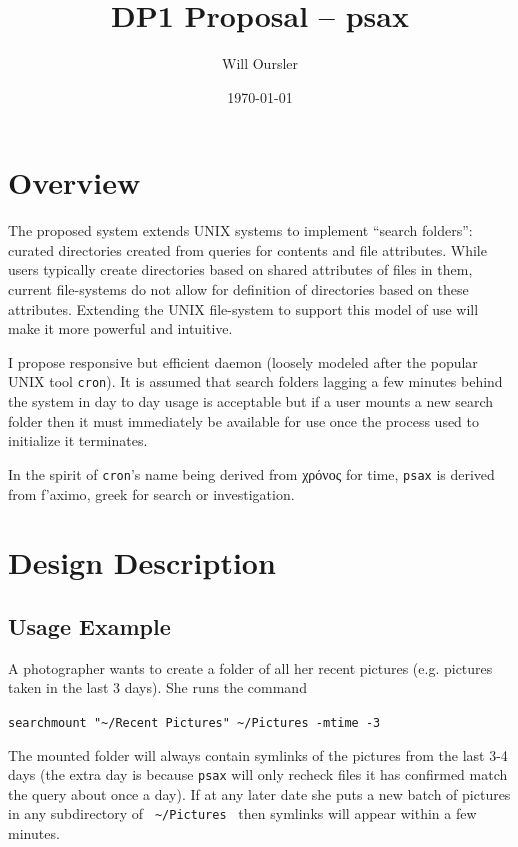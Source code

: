 \documentclass[a4paper]{report}
\title{DP1 Proposal -- psax}
\author{Will Oursler}
\date{\today}
\newcommand{\inlinecode}{\texttt}
\begin{document}
\maketitle

\section{Overview}

The proposed system extends UNIX systems to implement ``search folders'': curated directories created from queries for contents and file attributes. While users typically create directories based on shared attributes of files in them, current file-systems do not allow for definition of directories based on these attributes. Extending the UNIX file-system to support this model of use will make it more powerful and intuitive.

I propose responsive but efficient daemon (loosely modeled after the popular UNIX tool \inlinecode{cron}). It is assumed that search folders lagging a few minutes behind the system in day to day usage is acceptable but if a user mounts a new search folder then it must immediately be available for use once the process used to initialize it terminates.

In the spirit of \inlinecode{cron}'s name being derived from \textgreek{χρόνος} for time, \inlinecode{psax} is derived from \textgreek{f'aximo}, greek for search or investigation. 

\section{Design Description}

\subsection{Usage Example}

A photographer wants to create a folder of all her recent pictures (e.g. pictures taken in the last 3 days). She runs the command

\begin{center}
\inlinecode{searchmount "\textasciitilde/Recent Pictures" \textasciitilde/Pictures -mtime -3}
\end{center}

The mounted folder will always contain symlinks of the pictures from the last 3-4 days (the extra day is because \inlinecode{psax} will only recheck files it has confirmed match the query about once a day). If at any later date she puts a new batch of pictures in any subdirectory of \inlinecode{ \textasciitilde/Pictures } then symlinks will appear within a few minutes.
\end{document}
